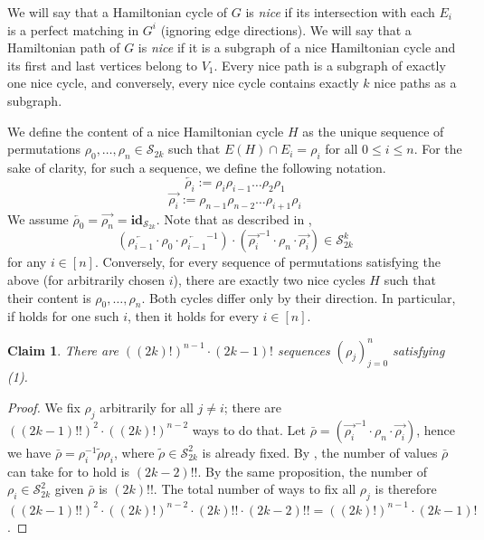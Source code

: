 \documentclass[11pt,a4paper]{article}
\newtheorem{claim}[lemma]{Claim}
\newcommand{\sym}{\mathcal{S}}
\begin{document}
    
    We will say that a Hamiltonian cycle of $G$ is \emph{nice} if its intersection with each $E_i$ is a perfect matching in $G^i$ (ignoring edge directions). We will say that a Hamiltonian path of $G$ is \emph{nice} if it is a subgraph of a nice Hamiltonian cycle and its first and last vertices belong to $V_1$. Every nice path is a subgraph of exactly one nice cycle, and conversely, every nice cycle contains exactly $k$ nice paths as a subgraph.

    We define the content of a nice Hamiltonian cycle $H$ as the unique sequence of permutations $\rho_0, \dots, \rho_n \in \sym_{2k}$ such that $E(H) \cap E_i = \rho_i$ for all $0 \leq i \leq n$.
    For the sake of clarity, for such a sequence, we define the following notation.
    $$
        \overleftarrow{\rho_i} := \rho_i \rho_{i - 1} \dots \rho_2 \rho_1
    $$
    $$
        \overrightarrow{\rho_i} := \rho_{n - 1} \rho_{n - 2} \dots \rho_{i + 1} \rho_{i}
    $$
    We assume $\overleftarrow{\rho_0} = \overrightarrow{\rho_n} = \textbf{id}_{\sym_{2k}}$. 
    Note that as described in ,
    \begin{equation}\label{eq:dst_nice_cycles}
        \left(
            \overleftarrow{\rho_{i - 1}} \cdot
            \rho_0 \cdot
            \overleftarrow{\rho_{i - 1}}^{-1}
        \right)
        \cdot
        \left(
            \overrightarrow{\rho_i}^{-1} \cdot
            \rho_n \cdot
            \overrightarrow{\rho_i}
        \right)
        \in \sym_{2k}^k
    \end{equation}
    for any $i \in [n]$.
    Conversely, for every sequence of permutations satisfying the above (for arbitrarily chosen $i$), there are exactly two nice cycles $H$ such that their content is $\rho_0, \dots, \rho_n$. Both cycles differ only by their direction. In particular, if  holds for one such $i$, then it holds for every $i \in [n]$.

    \begin{claim}
        There are $((2k)!)^{n - 1} \cdot (2k - 1)!$ sequences $(\rho_j)_{j=0}^n$ satisfying (1).
    \end{claim}

    \begin{proof}
        We fix $\rho_j$ arbitrarily for all $j \neq i$; there are $((2k - 1)!!)^2 \cdot ((2k)!)^{n - 2}$ ways to do that. Let $\bar\rho = \left(\overrightarrow{\rho_i}^{-1} \cdot \rho_n \cdot \overrightarrow{\rho_i}\right)$, hence we have $\bar\rho = \rho_i^{-1} \tilde\rho \rho_i$, where $\tilde\rho \in \sym_{2k}^2$ is already fixed. By , the number of values $\bar\rho$ can take for  to hold is $(2k - 2)!!$. By the same proposition, the number of $\rho_i \in \sym_{2k}^2$ given $\bar\rho$ is $(2k)!!$. The total number of ways to fix all $\rho_j$ is therefore $((2k - 1)!!)^2 \cdot ((2k)!)^{n - 2} \cdot (2k)!! \cdot (2k - 2)!! = ((2k)!)^{n - 1} \cdot (2k - 1)!$.
    \end{proof}
    
\end{document}
